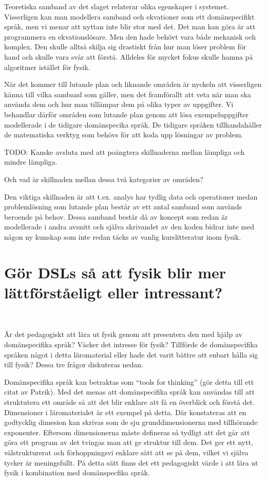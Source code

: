 \begin{binge}
Teoretiska samband av det slaget relaterar olika egenskaper i systemet.
Visserligen kan man modellera samband och ekvationer som ett domänspecifikt
språk, men vi menar att nyttan inte blir stor med det. Det man kan göra är att
programmera en ekvationslösare. Men den hade behövt vara både mekanisk och
komplex. Den skulle alltså skilja sig drastiskt från hur man löser problem för
hand och skulle vara svår att förstå. Alldeles för mycket fokus skulle hamna på
algoritmer istället för fysik.

När det kommer till lutande plan och liknande områden är nyckeln att visserligen
känna till vilka samband som gäller, men det framförallt att veta när man ska
använda dem och hur man tillämpar dem på olika typer av uppgifter. Vi behandlar
därför områden som lutande plan genom att lösa exempeluppgifter modellerade i de
tidigare domänspecika språk. De tidigare språken tillhandahåller de matematiska
verktyg som behövs för att koda upp lösningar av problem.


TODO: Kanske avsluta med att poängtera skillnaderna mellan lämpliga och mindre lämpliga.

Och vad är skillnaden mellan dessa två kategorier av områden?

Den viktiga skillnaden är att t.ex. analys har tydlig data och operationer 
medan problemlösning som lutande plan består av ett antal samband som används
beroende på behov. Dessa samband består då av koncept som redan är modellerade i
andra avsnitt och själva skrivandet av den koden bidrar inte med någon ny
kunskap som inte redan täcks av vanlig kurslitteratur inom fysik.

\section{Gör DSLs så att fysik blir mer lättförståeligt eller
intressant?}~\label{sec:bara_fysik}

Är det pedagogiskt att lära ut fysik genom att presentera den med hjälp av domänspecifika språk? Väcker det intresse för fysik? Tillförde de domänspecifika språken något i detta läromaterial eller hade det varit bättre att enbart hålla sig till fysik? Dessa tre frågor diskuteras nedan.

Domänspecifika språk kan betraktas som ``tools for thinking'' (gör detta till ett citat av Patrik). Med det menas att domänspecifika språk kan användas till att struktutera ett område så att det blir enklare att få en överblick och förstå det. Dimensioner i läromaterialet är ett exempel på detta. Där konstateras att en godtycklig dimesion kan skrivas som de sju grunddimensionerna med tillhörande exponenter. Eftersom dimensionerna måste defineras så tydligt att det går att göra ett program av det tvingas man att ge struktur till dem. Det ger ett nytt, välstrukturerat och förhoppningsvi enklare sätt att se på dem, vilket vi själva tycker är meningsfullt. På detta sätt finns det ett pedagogiskt värde i att lära ut fysik i kombination med domänspecfika språk.


\end{binge}
